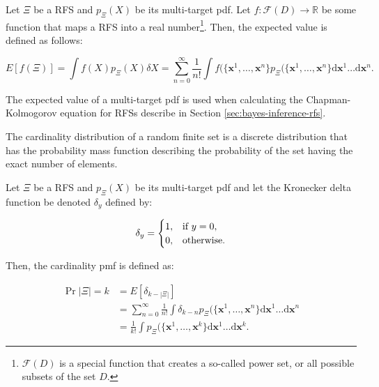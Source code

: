 \begin{definition}
    Let $\Xi$ be a RFS and $p_\Xi(X)$ be its multi-target pdf. Let $f: \mathcal{F}(D) \rightarrow \mathbb{R}$ be some function that maps a RFS into a real number\footnote{$\mathcal{F}(D)$ is a special function that creates a so-called power set, or all possible subsets of the set $D$.}. Then, the expected value is defined as follows:

    \begin{equation}
        E[f(\Xi)] = \int f(X)p_\Xi(X) \delta X
        = \sum_{n=0}^\infty \frac{1}{n !}
        \int f(\{\mathbf{x}^1, \ldots, \mathbf{x}^n\}
        p_\Xi(\{\mathbf{x}^1, \ldots, \mathbf{x}^n\}
        \mathrm{d}\mathbf{x}^1 \ldots \mathrm{d}\mathbf{x}^n.
    \end{equation}
\end{definition}

The expected value of a multi-target pdf is used when calculating the Chapman-Kolmogorov equation for RFSs describe in Section \ref{sec:bayes-inference-rfs}.

The cardinality distribution of a random finite set is a discrete distribution that has the probability mass function describing the probability of the set having the exact number of elements. 

\begin{definition}
    Let $\Xi$ be a RFS and $p_\Xi(X)$ be its multi-target pdf and let the Kronecker delta function be denoted $\delta_y$ defined by:

    \begin{equation}
        \delta_y = \begin{cases}
            1, & \textup{if } y = 0, \\
            0, & \textup{otherwise}.
        \end{cases}
    \end{equation}
    
    Then, the cardinality pmf is defined as:

    \begin{align}
        \Pr{|\Xi| = k}
        &= E[\delta_{k - |\Xi|}] \\
        &= \sum_{n=0}^\infty \frac{1}{n !}
        \int \delta_{k - n}
        p_\Xi(\{\mathbf{x}^1, \ldots, \mathbf{x}^n\}
        \mathrm{d}\mathbf{x}^1 \ldots \mathrm{d}\mathbf{x}^n \\
        &= \frac{1}{k !}
        \int p_\Xi(\{\mathbf{x}^1, \ldots, \mathbf{x}^k\}
        \mathrm{d}\mathbf{x}^1 \ldots \mathrm{d}\mathbf{x}^k.
    \end{align}
\end{definition}

